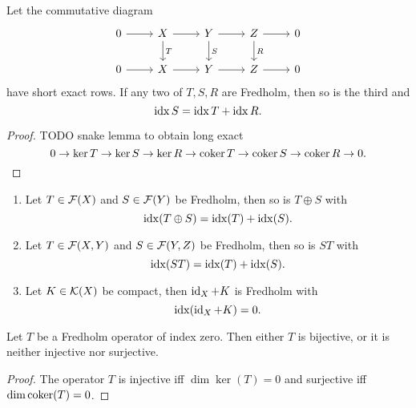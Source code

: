 \begin{lemma}
Let the commutative diagram
\[ \begin{tikzcd}
0 \rar & X \dar{T} \rar & Y \dar{S} \rar & Z \dar{R} \rar & 0 \\
0 \rar & X \rar & Y \rar & Z \rar & 0
\end{tikzcd} \]
have short exact rows. If any two of $T,S,R$ are Fredholm, then so is the third and
\[ \operatorname{idx} S = \operatorname{idx} T + \operatorname{idx} R. \]
\end{lemma}
\begin{proof}
TODO snake lemma to obtain long exact
\[ 0\to \ker T \to \ker S\to \ker R \to \operatorname{coker} T \to \operatorname{coker} S \to \operatorname{coker} R \to 0. \]
\end{proof}
\begin{corollary} \mbox{}
\begin{enumerate} 
\item Let $T\in\operatorname{\mathcal{F}}(X)$ and $S\in\operatorname{\mathcal{F}}(Y)$ be Fredholm, then so is $T\oplus S$ with
\[ \operatorname{idx}(T\oplus S) = \operatorname{idx}(T)+\operatorname{idx}(S). \]
\item Let $T\in\operatorname{\mathcal{F}}(X,Y)$ and $S\in\operatorname{\mathcal{F}}(Y,Z)$ be Fredholm, then so is $ST$ with
\[ \operatorname{idx}(ST) = \operatorname{idx}(T)+\operatorname{idx}(S). \]
\item Let $K\in\operatorname{\mathcal{K}}(X)$ be compact, then $\operatorname{id}_X+K$ is Fredholm with
\[ \operatorname{idx}(\operatorname{id}_X+K) = 0. \]
\end{enumerate}
\end{corollary}


\begin{lemma} \label{FredholmAlternative}
Let $T$ be a Fredholm operator of index zero. Then either $T$ is bijective, or it is neither injective nor surjective.
\end{lemma}
\begin{proof}
The operator $T$ is injective iff $\dim\ker(T) = 0$ and surjective iff $\dim\operatorname{coker}(T) = 0$.
\end{proof}


